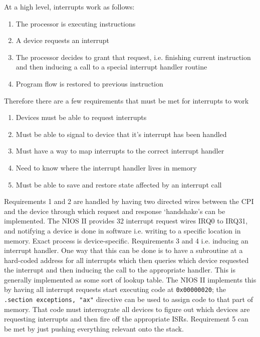 \documentclass[../notes.tex]{subfiles}
\begin{document}
At a high level, interrupts work as follows:


\begin{enumerate}
	\item The processor is executing instructions
	\item A device requests an interrupt
	\item The processor decides to grant that request, i.e. finishing current instruction and then inducing a call to a special interrupt handler routine
	\item Program flow is restored to previous instruction
\end{enumerate}


Therefore there are a few requirements that must be met for interrupts to work

\begin{enumerate}
	\item Devices must be able to request interrupts
	\item Must be able to signal to device that it's interrupt has been handled
	\item Must have a way to map interrupts to the correct interrupt handler
	\item Need to know where the interrupt handler lives in memory
	\item Must be able to save and restore state affected by an interrupt call
\end{enumerate}

Requirements 1 and 2 are handled by having two directed wires between the CPI and the device through which request and response `handshake's can be implemented. The NIOS II provides 32 interrupt request wires IRQ0 to IRQ31, and notifying a device is done in software i.e. writing to a specific location in memory. Exact process is device-specific.
Requirements 3 and 4 i.e. inducing an interrupt handler. One way that this can be done is to have a subroutine at a hard-coded address for all interrupts which then queries which device requested the interrupt and then inducing the call to the appropriate handler. This is generally implemented as some sort of lookup table. The NIOS II implements this by having all interrupt requests start executing code at \texttt{0x00000020}; the \texttt{.section exceptions, "ax"} directive can be used to assign code to that part of memory. That code must interrograte all devices to figure out which devices are requesting interrupts and then fire off the appropriate ISRs.
Requirement 5 can be met by just pushing everything relevant onto the stack.
\end{document}
